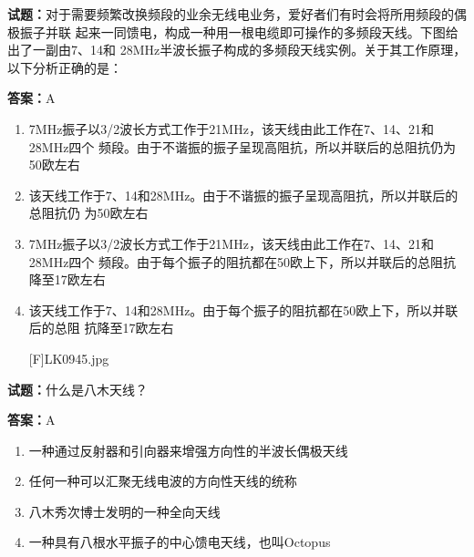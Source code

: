 \documentclass{ctexbook}
\begin{document}




\vspace{1em}

\textbf{试题：}对于需要频繁改换频段的业余无线电业务，爱好者们有时会将所用频段的偶极振子并联
起来一同馈电，构成一种用一根电缆即可操作的多频段天线。下图给出了一副由7、14和
28MHz半波长振子构成的多频段天线实例。关于其工作原理，以下分析正确的是： 

\textbf{答案：}A 

\begin{enumerate}[leftmargin=3em]
  \item 7MHz振子以3/2波长方式工作于21MHz，该天线由此工作在7、14、21和28MHz四个
频段。由于不谐振的振子呈现高阻抗，所以并联后的总阻抗仍为50欧左右 

  \item 该天线工作于7、14和28MHz。由于不谐振的振子呈现高阻抗，所以并联后的总阻抗仍
为50欧左右 

  \item 7MHz振子以3/2波长方式工作于21MHz，该天线由此工作在7、14、21和28MHz四个
频段。由于每个振子的阻抗都在50欧上下，所以并联后的总阻抗降至17欧左右 

  \item 该天线工作于7、14和28MHz。由于每个振子的阻抗都在50欧上下，所以并联后的总阻
抗降至17欧左右 

[F]LK0945.jpg 

\end{enumerate}






\vspace{1em}

\textbf{试题：}什么是八木天线？ 

\textbf{答案：}A 

\begin{enumerate}[leftmargin=3em]
  \item 一种通过反射器和引向器来增强方向性的半波长偶极天线 

  \item 任何一种可以汇聚无线电波的方向性天线的统称 

  \item 八木秀次博士发明的一种全向天线 

  \item 一种具有八根水平振子的中心馈电天线，也叫Octopus 

\end{enumerate}
\end{document}
